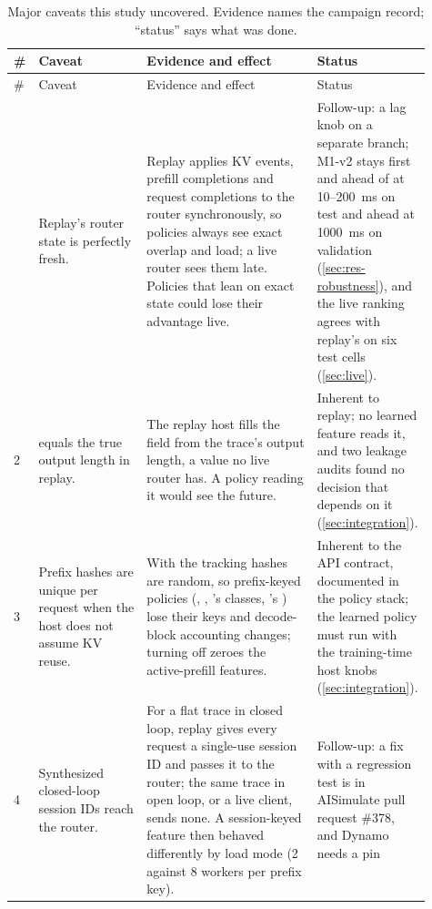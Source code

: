 {\footnotesize
\setlength{\LTcapwidth}{\linewidth}
\begin{longtable}{@{}P{0.04\linewidth}P{0.26\linewidth}P{0.41\linewidth}P{0.2\linewidth}@{}}
\caption{Major caveats this study uncovered. Evidence names the campaign record; ``status'' says
  what was done.}
\label{tab:caveats}\\
\toprule
\# & Caveat & Evidence and effect & Status \\
\midrule
\endfirsthead
\toprule
\# & Caveat & Evidence and effect & Status \\
\midrule
\endhead
\bottomrule
{} & Replay's router state is perfectly fresh. &
  Replay applies KV events, prefill completions and request completions to the router
  synchronously, so policies always see exact overlap and load; a live router sees them late.
  Policies that lean on exact state could lose their advantage live. &
  Follow-up: a lag knob on a separate branch; M1-v2 stays first and ahead of  at
  10--\SI{200}{ms} on test and ahead at \SI{1000}{ms} on validation (\cref{sec:res-robustness}),
  and the live ranking agrees with replay's on six test cells (\cref{sec:live}). \\
2 &  equals the true output length in replay. &
  The replay host fills the field from the trace's output length, a value no live router has.
  A policy reading it would see the future. &
  Inherent to replay; no learned feature reads it, and two leakage audits found no decision that
  depends on it (\cref{sec:integration}). \\
3 & Prefix hashes are unique per request when the host does not assume KV reuse. &
  With  the tracking hashes are random, so prefix-keyed
  policies (, , 's classes, \lc{}'s
  ) lose their keys and decode-block accounting changes; turning off
   zeroes the active-prefill features. &
  Inherent to the API contract, documented in the policy stack; the learned policy must run with
  the training-time host knobs (\cref{sec:integration}). \\
4 & Synthesized closed-loop session IDs reach the router. &
  For a flat trace in closed loop, replay gives every request a single-use session ID and passes
  it to the router; the same trace in open loop, or a live client, sends none. A session-keyed
  feature then behaved differently by load mode (2 against 8 workers per prefix key). &
  Follow-up: a fix with a regression test is in AISimulate pull request \#378, and Dynamo needs a pin

\end{longtable}}
